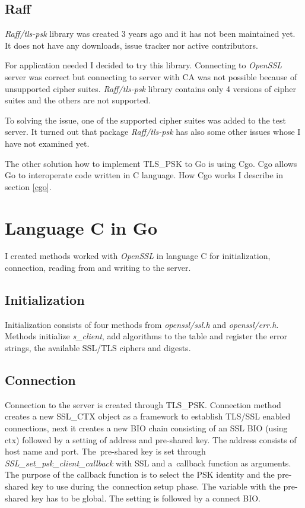 \documentclass[
  twoside, 12pt, 
  printed, %
  notable,   %
  lof,     %
  lot,     %
]{fithesis3}
\begin{document}
\subsection{Raff}\label{raff}
\textit{Raff/tls-psk} library was created 3 years ago and it has not been 
maintained yet. It does not have any downloads, issue tracker nor active contributors. 

For application needed I decided to try this library. Connecting to \textit{OpenSSL} server was 
correct but connecting to server with CA was not possible because of unsupported cipher 
suites. \textit{Raff/tls-psk} library contains only 4 versions of cipher suites and the others 
are not supported. 

To solving the issue, one of the supported cipher suites was added to the test server. It turned 
out that package \textit{Raff/tls-psk} has also some other issues whose I have not examined yet.

The other solution how to implement TLS\_PSK to Go is using Cgo. Cgo allows Go to 
interoperate code written in C language. How Cgo works I describe in section \ref{cgo}. 


\section{Language C in Go}\label{langCinGo}
I created methods worked with \textit{OpenSSL} in language C for initialization, connection, 
reading from and writing to the server.

\subsection{Initialization}
Initialization consists of four methods from \textit{openssl/ssl.h} and \textit{openssl/err.h}. 
Methods initialize \textit{s\_client}, add algorithms to the table and register the error strings, 
the available SSL/TLS ciphers and digests.

\subsection{Connection}\label{conn}
Connection to the server is created through TLS\_PSK. Connection method creates a new SSL\_CTX 
object as a framework to establish TLS/SSL enabled connections, next it creates a new BIO chain 
consisting of an SSL BIO (using ctx) followed by a setting of address and pre-shared key. The 
address consists of host name and port. The~pre-shared key is set through 
\textit{SSL\_set\_psk\_client\_callback} with SSL and a~callback function as arguments. The 
purpose of the callback function is to select the PSK identity and the pre-shared key to use 
during the~connection setup phase. The variable with the pre-shared key has to be global. The 
setting is followed by a connect BIO.
\end{document}

